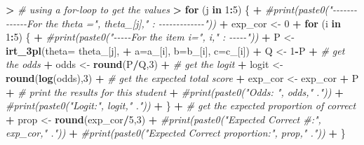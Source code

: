 \documentclass[
]{article}
\newenvironment{Shaded}{\begin{snugshade}}{\end{snugshade}}
\newcommand{\AttributeTok}[1]{\textcolor[rgb]{0.13,0.29,0.53}{#1}}
\newcommand{\CommentTok}[1]{\textcolor[rgb]{0.56,0.35,0.01}{\textit{#1}}}
\newcommand{\ControlFlowTok}[1]{\textcolor[rgb]{0.13,0.29,0.53}{\textbf{#1}}}
\newcommand{\DecValTok}[1]{\textcolor[rgb]{0.00,0.00,0.81}{#1}}
\newcommand{\ErrorTok}[1]{\textcolor[rgb]{0.64,0.00,0.00}{\textbf{#1}}}
\newcommand{\FunctionTok}[1]{\textcolor[rgb]{0.13,0.29,0.53}{\textbf{#1}}}
\newcommand{\NormalTok}[1]{#1}
\newcommand{\OtherTok}[1]{\textcolor[rgb]{0.56,0.35,0.01}{#1}}
\newcommand{\SpecialCharTok}[1]{\textcolor[rgb]{0.81,0.36,0.00}{\textbf{#1}}}
\begin{document}
\begin{Shaded}
\begin{Highlighting}[]
\SpecialCharTok{\textgreater{}} \CommentTok{\# using a for{-}loop to get the values}
\ErrorTok{\textgreater{}} \ControlFlowTok{for}\NormalTok{ (j }\ControlFlowTok{in} \DecValTok{1}\SpecialCharTok{:}\DecValTok{5}\NormalTok{) \{}
\SpecialCharTok{+}   \CommentTok{\#print(paste0("{-}{-}{-}{-}{-}{-}{-}{-}{-}{-}{-}{-}{-}For the theta =", theta\_[j]," : {-}{-}{-}{-}{-}{-}{-}{-}{-}{-}{-}{-}{-}"))}
\SpecialCharTok{+}\NormalTok{   exp\_cor }\OtherTok{\textless{}{-}} \DecValTok{0}
\SpecialCharTok{+}   \ControlFlowTok{for}\NormalTok{ (i }\ControlFlowTok{in} \DecValTok{1}\SpecialCharTok{:}\DecValTok{5}\NormalTok{) \{}
\SpecialCharTok{+}     \CommentTok{\#print(paste0("{-}{-}{-}{-}{-}For the item i=", i," : {-}{-}{-}{-}{-}"))}
\SpecialCharTok{+}\NormalTok{     P }\OtherTok{\textless{}{-}} \FunctionTok{irt\_3pl}\NormalTok{(}\AttributeTok{theta=}\NormalTok{ theta\_[j], }
\SpecialCharTok{+}                  \AttributeTok{a=}\NormalTok{a\_[i], }\AttributeTok{b=}\NormalTok{b\_[i], }\AttributeTok{c=}\NormalTok{c\_[i])}
\SpecialCharTok{+}\NormalTok{     Q }\OtherTok{\textless{}{-}} \DecValTok{1}\SpecialCharTok{{-}}\NormalTok{P}
\SpecialCharTok{+}     \CommentTok{\# get the odds}
\SpecialCharTok{+}\NormalTok{     odds }\OtherTok{\textless{}{-}} \FunctionTok{round}\NormalTok{(P}\SpecialCharTok{/}\NormalTok{Q,}\DecValTok{3}\NormalTok{)}
\SpecialCharTok{+}     \CommentTok{\# get the logit}
\SpecialCharTok{+}\NormalTok{     logit }\OtherTok{\textless{}{-}} \FunctionTok{round}\NormalTok{(}\FunctionTok{log}\NormalTok{(odds),}\DecValTok{3}\NormalTok{)    }
\SpecialCharTok{+}     \CommentTok{\# get the expected total score}
\SpecialCharTok{+}\NormalTok{     exp\_cor }\OtherTok{\textless{}{-}}\NormalTok{ exp\_cor }\SpecialCharTok{+}\NormalTok{ P}
\SpecialCharTok{+}     \CommentTok{\# print the results for this student}
\SpecialCharTok{+}     \CommentTok{\#print(paste0("Odds: ", odds," ."))}
\SpecialCharTok{+}     \CommentTok{\#print(paste0("Logit:", logit," ."))}
\SpecialCharTok{+}\NormalTok{   \}}
\SpecialCharTok{+}   \CommentTok{\# get the expected proportion of correct}
\SpecialCharTok{+}\NormalTok{   prop }\OtherTok{\textless{}{-}} \FunctionTok{round}\NormalTok{(exp\_cor}\SpecialCharTok{/}\DecValTok{5}\NormalTok{,}\DecValTok{3}\NormalTok{)}
\SpecialCharTok{+}   \CommentTok{\#print(paste0("Expected Correct \#:", exp\_cor," ."))}
\SpecialCharTok{+}   \CommentTok{\#print(paste0("Expected Correct proportion:", prop," ."))}
\SpecialCharTok{+}\NormalTok{ \}}
\end{Highlighting}
\end{Shaded}
\end{document}
